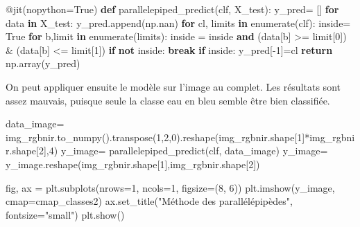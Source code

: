 \documentclass[
  french,
  11pt,
  letterpaper,
  open=any,
  twoside=false,
  french]{scrbook}
\newenvironment{Shaded}{\begin{snugshade}}{\end{snugshade}}
\newcommand{\AttributeTok}[1]{\textcolor[rgb]{0.40,0.45,0.13}{#1}}
\newcommand{\BuiltInTok}[1]{\textcolor[rgb]{0.00,0.23,0.31}{#1}}
\newcommand{\ControlFlowTok}[1]{\textcolor[rgb]{0.00,0.23,0.31}{\textbf{#1}}}
\newcommand{\DecValTok}[1]{\textcolor[rgb]{0.68,0.00,0.00}{#1}}
\newcommand{\KeywordTok}[1]{\textcolor[rgb]{0.00,0.23,0.31}{\textbf{#1}}}
\newcommand{\NormalTok}[1]{\textcolor[rgb]{0.00,0.23,0.31}{#1}}
\newcommand{\OperatorTok}[1]{\textcolor[rgb]{0.37,0.37,0.37}{#1}}
\newcommand{\StringTok}[1]{\textcolor[rgb]{0.13,0.47,0.30}{#1}}
\newcommand{\VariableTok}[1]{\textcolor[rgb]{0.07,0.07,0.07}{#1}}
\begin{document}
\begin{Shaded}
\begin{Highlighting}[]
\AttributeTok{@jit}\NormalTok{(nopython}\OperatorTok{=}\VariableTok{True}\NormalTok{)}
\KeywordTok{def}\NormalTok{ parallelepiped\_predict(clf, X\_test):}
\NormalTok{  y\_pred}\OperatorTok{=}\NormalTok{ []}
  \ControlFlowTok{for}\NormalTok{ data }\KeywordTok{in}\NormalTok{ X\_test:}
\NormalTok{    y\_pred.append(np.nan)}
    \ControlFlowTok{for}\NormalTok{ cl, limits }\KeywordTok{in} \BuiltInTok{enumerate}\NormalTok{(clf):}
\NormalTok{      inside}\OperatorTok{=} \VariableTok{True}
      \ControlFlowTok{for}\NormalTok{ b,limit }\KeywordTok{in} \BuiltInTok{enumerate}\NormalTok{(limits):}
\NormalTok{        inside }\OperatorTok{=}\NormalTok{ inside }\KeywordTok{and}\NormalTok{ (data[b] }\OperatorTok{\textgreater{}=}\NormalTok{ limit[}\DecValTok{0}\NormalTok{]) }\OperatorTok{\&}\NormalTok{ (data[b] }\OperatorTok{\textless{}=}\NormalTok{ limit[}\DecValTok{1}\NormalTok{])}
        \ControlFlowTok{if} \KeywordTok{not}\NormalTok{ inside:}
          \ControlFlowTok{break}
      \ControlFlowTok{if}\NormalTok{ inside:}
\NormalTok{        y\_pred[}\OperatorTok{{-}}\DecValTok{1}\NormalTok{]}\OperatorTok{=}\NormalTok{cl}
  \ControlFlowTok{return}\NormalTok{ np.array(y\_pred)}
\end{Highlighting}
\end{Shaded}

On peut appliquer ensuite le modèle sur l'image au complet. Les
résultats sont assez mauvais, puisque seule la classe eau en bleu semble
être bien classifiée.

\begin{Shaded}
\begin{Highlighting}[]
\NormalTok{data\_image}\OperatorTok{=}\NormalTok{ img\_rgbnir.to\_numpy().transpose(}\DecValTok{1}\NormalTok{,}\DecValTok{2}\NormalTok{,}\DecValTok{0}\NormalTok{).reshape(img\_rgbnir.shape[}\DecValTok{1}\NormalTok{]}\OperatorTok{*}\NormalTok{img\_rgbnir.shape[}\DecValTok{2}\NormalTok{],}\DecValTok{4}\NormalTok{)}
\NormalTok{y\_image}\OperatorTok{=}\NormalTok{ parallelepiped\_predict(clf, data\_image)}
\NormalTok{y\_image}\OperatorTok{=}\NormalTok{ y\_image.reshape(img\_rgbnir.shape[}\DecValTok{1}\NormalTok{],img\_rgbnir.shape[}\DecValTok{2}\NormalTok{])}

\NormalTok{fig, ax }\OperatorTok{=}\NormalTok{ plt.subplots(nrows}\OperatorTok{=}\DecValTok{1}\NormalTok{, ncols}\OperatorTok{=}\DecValTok{1}\NormalTok{, figsize}\OperatorTok{=}\NormalTok{(}\DecValTok{8}\NormalTok{, }\DecValTok{6}\NormalTok{))}
\NormalTok{plt.imshow(y\_image, cmap}\OperatorTok{=}\NormalTok{cmap\_classes2)}
\NormalTok{ax.set\_title(}\StringTok{"Méthode des parallélépipèdes"}\NormalTok{, fontsize}\OperatorTok{=}\StringTok{"small"}\NormalTok{)}
\NormalTok{plt.show()}
\end{Highlighting}
\end{Shaded}
\end{document}
